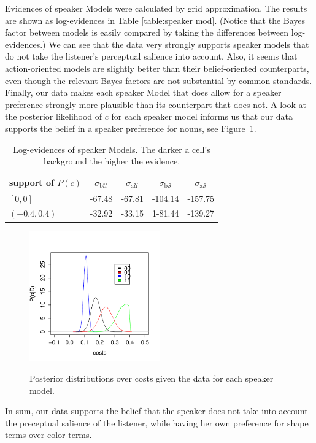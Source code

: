 Evidences of speaker Models were calculated by grid approximation. The
results are shown as log-evidences in Table \ref{table:speaker
  mod}. (Notice that the Bayes factor between models is easily
compared by taking the differences between log-evidences.) We can see
that the data very strongly supports speaker models that do not take
the listener's perceptual salience into account. Also, it seems that
action-oriented models are slightly better than their belief-oriented
counterparts, even though the relevant Bayes factors are not
substantial by common standards. Finally, our data makes each speaker
Model that does allow for a speaker preference strongly more plausible
than its counterpart that does not. A look at the posterior likelihood
of $c$ for each speaker model informs us that our data supports the
belief in a speaker preference for nouns, see
Figure~\ref{fig:cost_post_s}. 
%
\begin{table}[htb] 
  \centering 
  \caption{Log-evidences of speaker Models. The darker a cell's
    background the higher the evidence.}
  \begin{tabular}{lcccc}
    support of $P(c)$ 
    & $\sigma_{\mathrm{b}\mathcal{U}}$
    & $\sigma_{\mathrm{a}\mathcal{U}}$
    & $\sigma_{\mathrm{b}\mathcal{S}}$
    & $\sigma_{\mathrm{a}\mathcal{S}}$
    \\ \midrule
    $[0,0]$
    & \cellcolor{lightgray!72} -67.48 
    & \cellcolor{lightgray!72}  -67.81 
    & \cellcolor{lightgray!43} -104.14 
    & \cellcolor{lightgray!0} -157.75
    \\
    $(-0.4,0.4)$
    & \cellcolor{lightgray!100} -32.92 
    & \cellcolor{lightgray!99} -33.15  
    & \cellcolor{lightgray!61} \textcolor{lightgray!61}{1}-81.44 
    & \cellcolor{lightgray!15} -139.27
  \end{tabular} 
  \label{table:speaker mod}
\end{table}
%
\begin{figure}[htb]
  \centering
  \caption{Posterior distributions over costs given the data for each
    speaker model.}
  \includegraphics[width=0.5\textwidth]{pics/cost_post_s.pdf}
  \label{fig:cost_post_s}
\end{figure}
%
In sum, our data supports the belief that the speaker does not take
into account the preceptual salience of the listener, while having her
own preference for shape terms over color terms.


